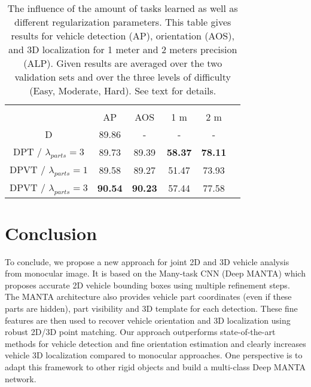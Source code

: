 \documentclass[10pt,twocolumn,letterpaper]{article}
\begin{document}
\begin{table}[ht]
\centering
\begin{tabular}{cccccc}
\multicolumn{1}{l}{}     & \multicolumn{1}{l}{}    & \multicolumn{1}{l}{}     & \multicolumn{1}{l}{}         & \multicolumn{1}{l}{}          \\ \cline{2-5} 
\multicolumn{1}{c|}{}    & \multicolumn{1}{c|}{AP} & \multicolumn{1}{c||}{AOS} &  \multicolumn{1}{c|}{1 m} & \multicolumn{1}{c|}{2 m} \\ \hline
\multicolumn{1}{|c|}{D} & \multicolumn{1}{c|}{89.86}  & \multicolumn{1}{c||}{-}   & \multicolumn{1}{c|}{-}       & \multicolumn{1}{c|}{-}        \\
\multicolumn{1}{|c|}{DPT / $\lambda_{parts} = 3$} & \multicolumn{1}{c|}{89.73}  & \multicolumn{1}{c||}{89.39}  & \multicolumn{1}{c|}{\textbf{58.37}}       & \multicolumn{1}{c|}{\textbf{78.11}}        \\ 
\multicolumn{1}{|c|}{DPVT / $\lambda_{parts} = 1$} & \multicolumn{1}{c|}{89.58}  & \multicolumn{1}{c||}{89.27}  & \multicolumn{1}{c|}{51.47}       & \multicolumn{1}{c|}{73.93}        \\ 
\multicolumn{1}{|c|}{DPVT / $\lambda_{parts} = 3$} & \multicolumn{1}{c|}{\textbf{90.54}}  & \multicolumn{1}{c||}{\textbf{90.23}}  & \multicolumn{1}{c|}{57.44} & \multicolumn{1}{c|}{77.58} \\ \hline
\end{tabular}
\vspace{3mm}
\caption{The influence of the amount of tasks learned as well as different regularization parameters. This table gives results for vehicle detection (AP), orientation (AOS), and 3D localization for 1 meter and 2 meters precision (ALP). Given results are averaged over the two validation sets and over the three levels of difficulty (Easy, Moderate, Hard). See text for details.}
\label{medley}
\end{table}
\section{Conclusion}
\label{sec:conclusion}
To conclude, we propose a new approach for joint 2D and 3D vehicle analysis from monocular image. It is based on the Many-task CNN (Deep MANTA) which proposes accurate 2D vehicle bounding boxes using multiple refinement steps. The MANTA architecture also provides vehicle part coordinates (even if these parts are hidden), part visibility and 3D template for each detection. These fine features are then used to recover vehicle orientation and 3D localization using robust 2D/3D point matching. Our approach outperforms state-of-the-art methods for vehicle detection and fine orientation estimation and clearly increases vehicle 3D localization compared to monocular approaches. One perspective is to adapt this framework to other rigid objects and build a multi-class Deep MANTA network.

{\small


}
\end{document}
